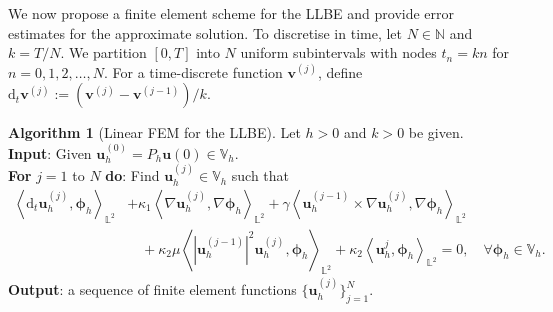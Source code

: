 \documentclass[11pt,reqno]{amsart}
\theoremstyle{definition}
\newtheorem{algorithm}[theorem]{Algorithm}
\numberwithin{equation}{section}
\newcommand{\bff}{\boldsymbol}
\newcommand{\bb}{\mathbb}
\newcommand{\nn}{\nonumber}
\newcommand{\norm}[2]{\left\|{#1}\right\|_{#2}}
\newcommand{\inpro}[2]{\left\langle#1,#2\right\rangle}
\begin{document}





We now propose a finite element scheme for the LLBE and 
provide error estimates for the approximate solution. To discretise in time, let $N\in\bb{N}$ and $k=T/N$. We
partition $[0,T]$ into $N$ uniform subintervals with nodes $t_n=kn$ for $n=0,1,2,\ldots,N$. For a time-discrete function $\bff{v}^{(j)}$, define $\mathrm{d}_t \bff{v}^{(j)}:= (\bff{v}^{(j)}-\bff{v}^{(j-1)})/k$. 

\begin{algorithm}[Linear FEM for the LLBE]\label{alg:fem llbe}
{Let $h>0$ and $k>0$ be given.
\\
\textbf{Input}: Given $\bff{u}_h^{(0)}= P_h \bff{u}(0)\in \bb{V}_h$.
\\
\textbf{For} $j=1$ to $N$ \textbf{do}: Find $\bff{u}_h^{(j)}\in\bb{V}_h$ such that 
\begin{align}\label{equ:dis1 llb}
	\inpro{\mathrm{d}_t\bff{u}_h^{(j)}}{\bff{\phi}_h}_{\bb{L}^2}
	&+
	\kappa_1 \inpro{\nabla\bff{u}_h^{(j)}}{\nabla\bff{\phi}_h}_{\bb{L}^2}
	+
	\gamma \inpro{\bff{u}_h^{(j-1)}\times\nabla\bff{u}_h^{(j)}}{\nabla\bff{\phi}_h}_{\bb{L}^2}
	\nn\\
	&\quad
	+
	\kappa_2 \mu
	\inpro{|\bff{u}_h^{(j-1)}|^2 \bff{u}_h^{(j)}}{\bff{\phi}_h}_{\bb{L}^2}
	+
	\kappa_2 \inpro{\bff{u}_h^j}{\bff{\phi}_h}_{\bb{L}^2}
	=0,
	\quad\forall \bff{\phi}_h\in\bb{V}_h.
\end{align}
\textbf{Output}: a sequence of finite element functions $\big\{\bff{u}_h^{(j)}\big\}_{j=1}^N$.}
\end{algorithm}
\end{document}
